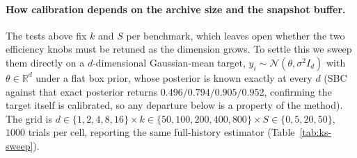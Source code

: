 \paragraph{How calibration depends on the archive size and the snapshot buffer.} The tests above fix $k$ and $S$ per benchmark, which leaves open whether the two efficiency knobs must be retuned as the dimension grows. To settle this we sweep them directly on a $d$-dimensional Gaussian-mean target, $y_i\sim\mathcal N(\theta,\sigma^2 I_d)$ with $\theta\in\mathbb R^d$ under a flat box prior, whose posterior is known exactly at every $d$ (SBC against that exact posterior returns $0.496/0.794/0.905/0.952$, confirming the target itself is calibrated, so any departure below is a property of the method). The grid is $d\in\{1,2,4,8,16\}\times k\in\{50,100,200,400,800\}\times S\in\{0,5,20,50\}$, $1000$ trials per cell, reporting the same full-history estimator (Table~\ref{tab:ks-sweep}).

